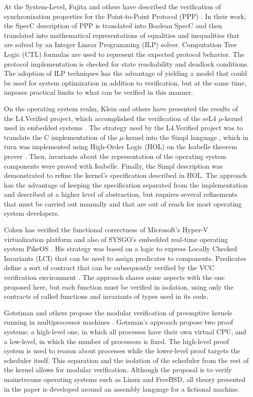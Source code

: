 \documentclass{sig-alternate}
\begin{document}
At the System-Level, Fujita and others have described the verification
of synchronization properties for the Point-to-Point Protocol (PPP)
\cite{Fujita:2008}.  In their work, the SpecC description of PPP is
translated into Boolean SpecC and then translated into mathematical
representations of equalities and inequalities that are solved by an
Integer Linear Programming (ILP) solver. Computation Tree Logic (CTL)
formulas are used to represent the expected protocol behavior. The
protocol implementation is checked for state reachability and deadlock
conditions. The adoption of ILP techniques has the advantage of yielding
a model that could be used for system optimization in addition to
verification, but at the same time, imposes practical limits to what can
be verified in this manner.

On the operating system realm, Klein and others have presented the
results of the L4.Verified project, which accomplished the verification
of the seL4 $\mu$-kernel used in embedded systems \cite{Klein:2009}.
The strategy used by the L4.Verified project was to translate the C
implementation of the $\mu$-kernel into the Simpl language
\cite{Schirmer:2006:PHD}, which in turn was implemented using High-Order
Logic (HOL) on the Isabelle theorem prover \cite{Nipkow:2002}.  Then,
invariants about the representation of the operating system components
were proved with Isabelle. Finally, the Simpl description was
demonstrated to refine the kernel's specification described in HOL. The
approach has the advantage of keeping the specification separated from
the implementation and described at a higher level of abstraction, but
requires several refinements that must be carried out manually and that
are out of reach for most operating system developers.

Cohen has verified the functional correctness of Microsoft’s Hyper-V
virtualization platform and also of SYSGO’s embedded real-time operating
system PikeOS \cite{Cohen:2010}.  His strategy was based on a logic to
express Locally Checked Invariants (LCI) that can be used to assign
predicates to components. Predicates define a sort of contract that can
be subsequently verified by the VCC verification environment
\cite{Cohen:2009}. The approach shares some aspects with the one
proposed here, but each function must be verified in isolation, using
only the contracts of called functions and invariants of types used in
its code.

Gotstman and others propose the modular verification of preemptive
kernels running in multiprocessor machines \cite{Gotsman:2011}.
Gotsman's approach propose two proof systems: a high-level one, in which
all processes have their own virtual CPU, and a low-level, in which the
number of processors is fixed.  The high-level proof system is used to
reason about processes while the lower-level proof targets the scheduler
itself. This separation and the isolation of the scheduler from the rest
of the kernel allows for modular verification.  Although the proposal is
to verify mainstreams operating systems such as Linux and FreeBSD, all
theory presented in the paper is developed around an assembly language
for a fictional machine.
\end{document}
